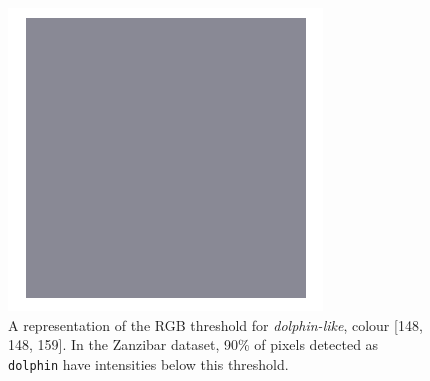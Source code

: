 \begin{figure}
	\begin{center}
		\includegraphics[scale=0.3]{Chapter3/figs/148-148-159.png}
	\end{center}
	\caption[A representation of the RGB threshold for \textit{dolphin-like}, colour {[}148, 148, 159{]}.]{A representation of the RGB threshold for \textit{dolphin-like}, colour {[}148, 148, 159{]}. In the Zanzibar dataset, 90\% of pixels detected as \texttt{dolphin} have intensities below this threshold.}\label{fig:colour-threshold}
\end{figure}

